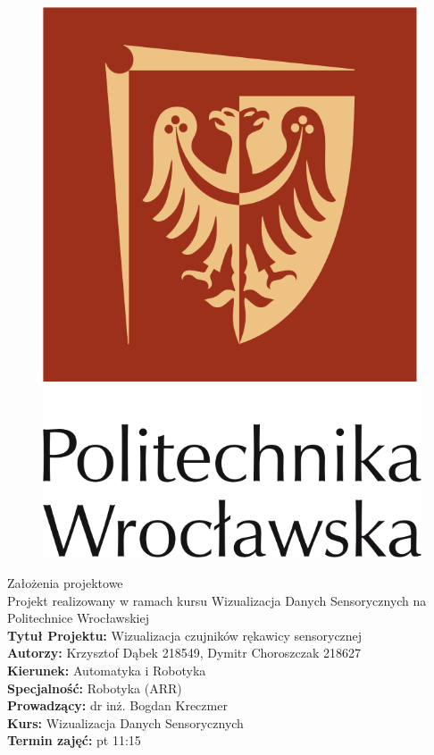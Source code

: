\documentclass[12pt,a4paper]{article}
\begin{document}
\begin{figure}[!htb]
\centering
\includegraphics[scale=1.6]{logo.png}
\end{figure}
\LARGE\centering Założenia projektowe\\
\large\centering Projekt realizowany w ramach kursu Wizualizacja Danych Sensorycznych na Politechnice Wrocławskiej\\
\vspace{5 mm}
\normalsize\flushleft\textbf{Tytuł Projektu:} Wizualizacja czujników rękawicy sensorycznej\\
\textbf{Autorzy:} Krzysztof Dąbek 218549, Dymitr Choroszczak 218627\\
\textbf{Kierunek:} Automatyka i Robotyka\\
\textbf{Specjalność:} Robotyka (ARR)\\
\textbf{Prowadzący:} dr inż. Bogdan Kreczmer\\
\textbf{Kurs:} Wizualizacja Danych Sensorycznych\\
\textbf{Termin zajęć:} pt 11:15\\
\vspace{5 mm}
\end{document}
